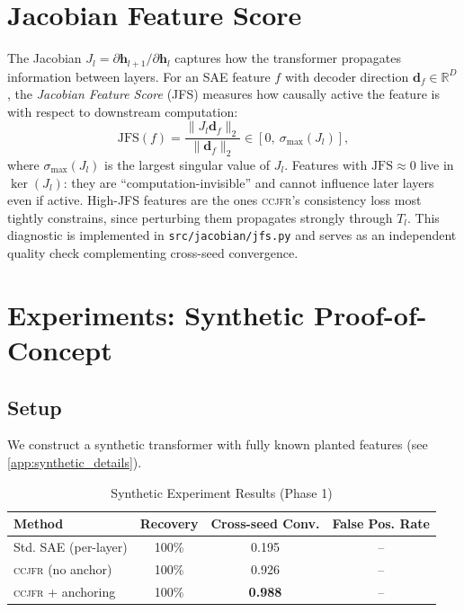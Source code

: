 \documentclass[12pt,a4paper]{article}
\newcommand{\RR}{\mathbb{R}}
\newcommand{\bh}{\mathbf{h}}
\newcommand{\CCJFR}{\textsc{ccjfr}}
\begin{document}
\section{Jacobian Feature Score}
\label{sec:jacobian}

The Jacobian $J_l = \partial \bh_{l+1} / \partial \bh_l$ captures how the transformer propagates information between layers.
For an SAE feature $f$ with decoder direction $\mathbf{d}_f \in \RR^D$, the \emph{Jacobian Feature Score} (JFS) measures how causally active the feature is with respect to downstream computation:
\[
  \mathrm{JFS}(f) = \frac{\|J_l \mathbf{d}_f\|_2}{\|\mathbf{d}_f\|_2} \in [0,\ \sigma_{\max}(J_l)],
\]
where $\sigma_{\max}(J_l)$ is the largest singular value of $J_l$.
Features with $\mathrm{JFS} \approx 0$ live in $\ker(J_l)$: they are ``computation-invisible'' and cannot influence later layers even if active.
High-JFS features are the ones \CCJFR{}'s consistency loss most tightly constrains, since perturbing them propagates strongly through $T_l$.
This diagnostic is implemented in \texttt{src/jacobian/jfs.py} and serves as an independent quality check complementing cross-seed convergence.

\section{Experiments: Synthetic Proof-of-Concept}
\label{sec:synthetic}

\subsection{Setup}

We construct a synthetic transformer with fully known planted features
(see \cref{app:synthetic_details}).

\begin{table}[h]
\centering
\caption{Synthetic Experiment Results (Phase 1)}
\label{tab:synthetic}
\begin{tabular}{lccc}
\toprule
Method & Recovery & Cross-seed Conv. & False Pos. Rate \\
\midrule
Std. SAE (per-layer) & 100\% & 0.195 & -- \\
\CCJFR{} (no anchor) & 100\% & 0.926 & -- \\
\CCJFR{} + anchoring & 100\% & \textbf{0.988} & -- \\
\bottomrule
\end{tabular}
\end{table}
\end{document}
